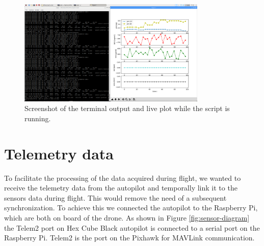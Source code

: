 \begin{figure}[H]
    \centering
    \includegraphics[width=0.8\textwidth]{images/cmd-and-plot.png}
    \caption{Screenshot of the terminal output and live plot while the script is running.}
    \label{fig:cmd-and-plot}
\end{figure}
\section{Telemetry data}
\label{section:telem-data}
To facilitate the processing of the data acquired during flight, we wanted to receive the telemetry data from the autopilot and temporally link it to the sensors data during flight. This would remove the need of a subsequent synchronization. To achieve this we connected the autopilot to the Raspberry Pi, which are both on board of the drone.
As shown in Figure \ref{fig:sensor-diagram} the Telem2 port on Hex Cube Black autopilot is connected to a serial port on the Raspberry Pi. Telem2 is the port on the Pixhawk for MAVLink communication.
